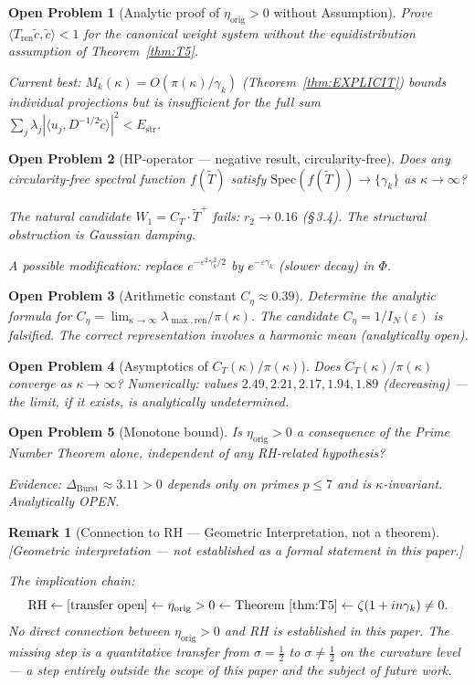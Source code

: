 \documentclass[11pt]{article}
\newtheorem*{remark}{Remark}
\newtheorem*{openproblem}{Open Problem}
\newcommand{\Estr}{E_{\mathrm{str}}}
\newcommand{\etaorig}{\eta_{\mathrm{orig}}}
\newcommand{\Tren}{T_{\mathrm{ren}}}
\newcommand{\Tt}{\widetilde{T}}
\newcommand{\Ceta}{C_{\eta}}
\newcommand{\CT}{C_{T}}
\newcommand{\Wone}{W_1}
\newcommand{\Dburstvar}{\Delta_{\mathrm{Burst}}}
\begin{document}
\begin{openproblem}[Analytic proof of $\etaorig > 0$ without Assumption]
Prove $\langle\Tren\tilde{c},\tilde{c}\rangle < 1$ for the canonical
weight system without the equidistribution assumption of
Theorem~\ref{thm:T5}.

Current best: $M_k(\kappa) = O(\pi(\kappa)/\gamma_k)$
(Theorem~\ref{thm:EXPLICIT}) bounds individual projections but is
insufficient for the full sum
$\sum_j\lambda_j|\langle u_j, D^{-1/2}\tilde{c}\rangle|^2 < \Estr$.
\end{openproblem}

\begin{openproblem}[HP-operator --- negative result, circularity-free]
Does any circularity-free spectral function $f(\Tt)$ satisfy
$\mathrm{Spec}(f(\Tt))\to\{\gamma_k\}$ as $\kappa\to\infty$?

The natural candidate $\Wone = \CT\cdot\Tt^+$ fails: $r_2\to 0.16$
(\S\,3.4). The structural obstruction is Gaussian damping.

A possible modification: replace $e^{-\varepsilon^2\gamma_k^2/2}$
by $e^{-\varepsilon\gamma_k}$ (slower decay) in $\Phi$.
\end{openproblem}

\begin{openproblem}[Arithmetic constant $\Ceta\approx 0.39$]
Determine the analytic formula for
$\Ceta = \lim_{\kappa\to\infty}\lambda_{\max,\mathrm{ren}}/\pi(\kappa)$.
The candidate $\Ceta = 1/I_N(\varepsilon)$ is falsified.
The correct representation involves a harmonic mean
(analytically open).
\end{openproblem}

\begin{openproblem}[Asymptotics of $\CT(\kappa)/\pi(\kappa)$]
Does $\CT(\kappa)/\pi(\kappa)$ converge as $\kappa\to\infty$?
Numerically: values $2.49, 2.21, 2.17, 1.94, 1.89$ (decreasing) ---
the limit, if it exists, is analytically undetermined.
\end{openproblem}

\begin{openproblem}[Monotone bound]
Is $\etaorig > 0$ a consequence of the Prime Number Theorem alone,
independent of any RH-related hypothesis?

Evidence: $\Dburstvar\approx 3.11 > 0$ depends only on primes
$p\leq 7$ and is $\kappa$-invariant.
Analytically OPEN.
\end{openproblem}

\begin{remark}[Connection to RH --- Geometric Interpretation, not a theorem]
\emph{[Geometric interpretation --- not established as a formal
statement in this paper.]}

The implication chain:
\[
\mathrm{RH} \leftarrow
[\text{transfer open}]
\leftarrow \etaorig > 0
\leftarrow \text{Theorem~\ref{thm:T5}}
\leftarrow \zeta(1+in\gamma_k)\neq 0.
\]
No direct connection between $\etaorig > 0$ and RH is established
in this paper. The missing step is a quantitative transfer from
$\sigma=\tfrac{1}{2}$ to $\sigma\neq\tfrac{1}{2}$ on the curvature level
--- a step entirely outside the scope of this paper and the subject of
future work.
\end{remark}
\end{document}
